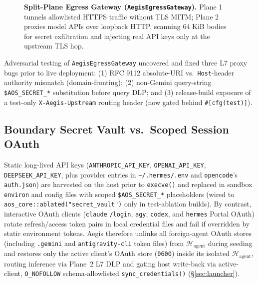 \documentclass[10pt,twocolumn]{article}
\begin{document}
\begin{figure}[!t]
{%
}
\caption{\textbf{Split-Plane Egress Gateway (\texttt{AegisEgressGateway}).} Plane 1 tunnels allowlisted HTTPS traffic without TLS MITM; Plane 2 proxies model APIs over loopback HTTP, scanning 64 KiB bodies for secret exfiltration and injecting real API keys only at the upstream TLS hop.}
\label{fig:egress}
\end{figure}

Adversarial testing of \texttt{AegisEgressGateway} uncovered and fixed three L7 proxy bugs prior to live deployment: (1) RFC 9112 absolute-URI vs.\ \texttt{Host}-header authority mismatch (domain-fronting); (2) non-Gemini query-string \texttt{\$AOS\_SECRET\_*} substitution before query DLP; and (3) release-build exposure of a test-only \texttt{X-Aegis-Upstream} routing header (now gated behind \texttt{\#[cfg(test)]}).

\subsection{Boundary Secret Vault vs.\ Scoped Session OAuth}

Static long-lived API keys (\texttt{ANTHROPIC\_API\_KEY}, \texttt{OPENAI\_API\_KEY}, \texttt{DEEPSEEK\_API\_KEY}, plus provider entries in \texttt{\textasciitilde/.hermes/.env} and \texttt{opencode}'s \texttt{auth.json}) are harvested on the host prior to \texttt{execve()} and replaced in sandbox \texttt{environ} and config files with scoped \texttt{\$AOS\_SECRET\_*} placeholders (wired to \texttt{aos\_core::ablated("secret\_vault")} only in test-ablation builds). By contrast, interactive OAuth clients (\texttt{claude} \texttt{/login}, \texttt{agy}, \texttt{codex}, and \texttt{hermes} Portal OAuth) rotate refresh/access token pairs in local credential files and fail if overridden by static environment tokens. Aegis therefore unlinks all foreign-agent OAuth stores (including \texttt{.gemini} and \texttt{antigravity-cli} token files) from $\mathcal{H}_{\text{agent}}$ during seeding and restores only the active client's OAuth store (\texttt{0600}) inside its isolated $\mathcal{H}_{\text{agent}}$, routing inference via Plane~2 L7 DLP and gating host write-back via active-client, \texttt{O\_NOFOLLOW} schema-allowlisted \texttt{sync\_credentials()} (\S\ref{sec:launcher}).
\end{document}
